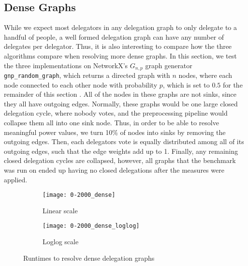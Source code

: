 \subsection{Dense Graphs}

While we expect most delegators in any delegation graph to only delegate to a handful of people, a well formed delegation graph can have any number of delegates per delegator. Thus, it is also interesting to compare how the three algorithms compare when resolving more dense graphs. In this section, we test the three implementations on NetworkX's $G_{n,p}$ graph generator \texttt{gnp\_random\_graph}, which returns a directed graph with $n$ nodes, where each node connected to each other node with probability $p$, which is set to $0.5$ for the remainder of this section \cite{hagbergExploringNetworkStructure2008}. All of the nodes in these graphs are not sinks, since they all have outgoing edges. Normally, these graphs would be one large closed delegation cycle, where nobody votes, and the preprocessing pipeline would collapse them all into one sink node. Thus, in order to be able to resolve meaningful power values, we turn 10\% of nodes into sinks by removing the outgoing edges. Then, each delegators vote is equally distributed among all of its outgoing edges, such that the edge weights add up to 1. Finally, any remaining closed delegation cycles are collapsed, however, all graphs that the benchmark was run on ended up having no closed delegations after the measures were applied.

\begin{figure}[t]
    \centering
    \begin{subfigure}[t]{0.45\textwidth}
    	\centering
    	\texttt{[image: 0-2000\_dense]}
    	\caption{Linear scale}
    	\label{fig:dense-linear}
    \end{subfigure}
    \hfill
    \begin{subfigure}[t]{0.45\textwidth}
        \centering
        \texttt{[image: 0-2000\_dense\_loglog]}
        \caption{Loglog scale}
         \label{subfig:dense-loglog}
    \end{subfigure}
    \caption{Runtimes to resolve dense delegation graphs}
    \label{fig:dense}
\end{figure}

